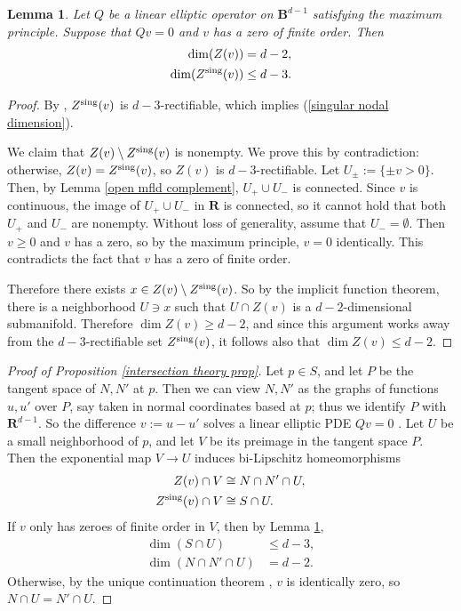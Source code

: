 \documentclass[reqno,11pt]{amsart}
\newcommand{\RR}{\mathbf{R}}
\newcommand{\Ball}{\mathbf{B}}
\newtheorem{lemma}[theorem]{Lemma}
\theoremstyle{definition}
\numberwithin{equation}{section}
\begin{document}
\begin{lemma}\label{nodal set is generically smooth}
Let $Q$ be a linear elliptic operator on $\Ball^{d - 1}$ satisfying the maximum principle.
Suppose that $Qv = 0$ and $v$ has a zero of finite order.
Then
\begin{align}
	\dim(Z(v)) &= d - 2, \label{nodal dimension}\\
	\dim(Z^{\rm sing}(v)) &\leq d - 3. \label{singular nodal dimension}
\end{align}
\end{lemma}
\begin{proof}
By \cite[Lemma 1.9]{Hardt89}, $Z^{\rm sing}(v)$ is $d - 3$-rectifiable, which implies (\ref{singular nodal dimension}).

We claim that $Z(v) \setminus Z^{\rm sing}(v)$ is nonempty.
We prove this by contradiction: otherwise, $Z(v) = Z^{\rm sing}(v)$, so $Z(v)$ is $d - 3$-rectifiable.
Let $U_\pm := \{\pm v > 0\}$.
Then, by Lemma \ref{open mfld complement}, $U_+ \cup U_-$ is connected.
Since $v$ is continuous, the image of $U_+ \cup U_-$ in $\RR$ is connected, so it cannot hold that both $U_+$ and $U_-$ are nonempty.
Without loss of generality, assume that $U_- = \emptyset$.
Then $v \geq 0$ and $v$ has a zero, so by the maximum principle, $v = 0$ identically.
This contradicts the fact that $v$ has a zero of finite order.

Therefore there exists $x \in Z(v) \setminus Z^{\rm sing}(v)$.
So by the implicit function theorem, there is a neighborhood $U \ni x$ such that $U \cap Z(v)$ is a $d - 2$-dimensional submanifold.
Therefore $\dim Z(v) \geq d - 2$, and since this argument works away from the $d - 3$-rectifiable set $Z^{\rm sing}(v)$, it follows also that $\dim Z(v) \leq d - 2$.
\end{proof}

\begin{proof}[Proof of Proposition \ref{intersection theory prop}]
Let $p \in S$, and let $P$ be the tangent space of $N, N'$ at $p$.
Then we can view $N, N'$ as the graphs of functions $u, u'$ over $P$, say taken in normal coordinates based at $p$; thus we identify $P$ with $\RR^{d - 1}$.
So the difference $v := u - u'$ solves a linear elliptic PDE $Qv = 0$ \cite[Proof of Theorem 7.3]{colding2011course}.
Let $U$ be a small neighborhood of $p$, and let $V$ be its preimage in the tangent space $P$.
Then the exponential map $V \to U$ induces bi-Lipschitz homeomorphisms
\begin{align*}
Z(v) \cap V &\cong N \cap N' \cap U, \\
Z^{\rm sing}(v) \cap V &\cong S \cap U.
\end{align*}
If $v$ only has zeroes of finite order in $V$, then by Lemma \ref{nodal set is generically smooth},
\begin{align*}
\dim (S \cap U) &\leq d - 3, \\
\dim (N \cap N' \cap U) &= d - 2.
\end{align*}
Otherwise, by the unique continuation theorem \cite[Theorem 6.1]{colding2011course}, $v$ is identically zero, so $N \cap U = N' \cap U$.
\end{proof}
\end{document}
